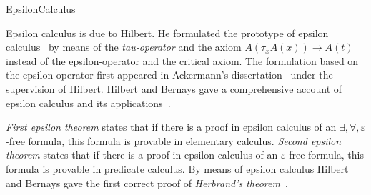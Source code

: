 \begin{entry}{EpsilonCalculus}

\begin{history}
  Epsilon calculus is due to Hilbert.  He formulated the prototype of
  epsilon calculus~\cite{Hilbert1923} by means of the
  \emph{tau-operator} and the axiom \(A(\tau_x A(x)) \to A(t)\) instead
  of the epsilon-operator and the critical axiom.  The formulation based
  on the epsilon-operator first appeared in Ackermann's
  dissertation~\cite{Ackermann1924} under the supervision of Hilbert.
  Hilbert and Bernays gave a comprehensive account of epsilon calculus
  and its applications~\cite{HilbertBernays1939}.
\end{history}

\begin{technicalities}
  \emph{First epsilon theorem} states that if there is a proof in
  epsilon calculus of an $\exists,\forall,\varepsilon$-free formula,
  this formula is provable in elementary calculus.  \emph{Second epsilon
  theorem} states that if there is a proof in epsilon calculus of an
  $\varepsilon$-free formula, this formula is provable in predicate
  calculus.  By means of epsilon calculus Hilbert and Bernays gave the
  first correct proof of \emph{Herbrand's
  theorem}~\cite{HilbertBernays1939,MoserZach06}.
\end{technicalities}

\end{entry}
